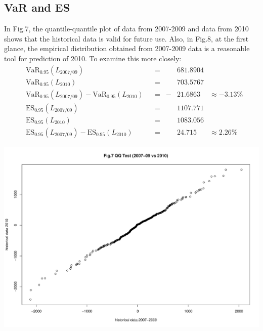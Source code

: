 \documentclass[11pt]{article}
\begin{document}
\vspace{-1em}\subsection{VaR and ES}\vspace{-1em}
In Fig.7, the quantile-quantile plot of data from 2007-2009 and data from 2010 shows that the historical data is valid for future use. Also, in Fig.8, at the first glance, the empirical distribution obtained from 2007-2009 data is a reasonable tool for prediction of 2010. To examine this more closely:
\begin{align*} 
  &\text{VaR}_{0.95}(L_{2007/09})& &=& &681.8904& \\
  &\text{VaR}_{0.95}(L_{2010})& &=& &703.5767& \\
  &\text{VaR}_{0.95}(L_{2007/09}) - \text{VaR}_{0.95}(L_{2010})& &=&- &21.6863& \approx -3.13\%\\
  &\text{ES}_{0.95}(L_{2007/09})& &=& &1107.771& \\
  &\text{ES}_{0.95}(L_{2010})& &=& &1083.056& \\
  &\text{ES}_{0.95}(L_{2007/09}) - \text{ES}_{0.95}(L_{2010})& &=& &24.715& \approx 2.26\%
\end{align*}
\vspace{-2.5em}
\begin{center}
  \includegraphics[width=0.85\linewidth]{graph/QQ200709against2010.pdf}\\
\end{center}
\end{document}
